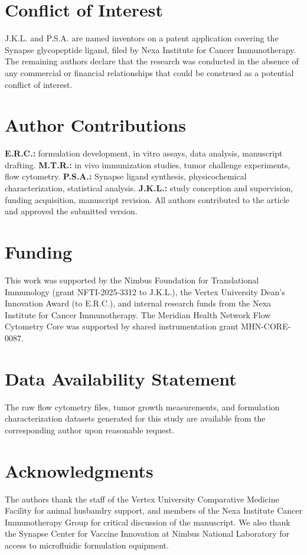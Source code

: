 \section*{Conflict of Interest}
J.K.L. and P.S.A. are named inventors on a patent application covering the Synapse glycopeptide ligand, filed by Nexa Institute for Cancer Immunotherapy. The remaining authors declare that the research was conducted in the absence of any commercial or financial relationships that could be construed as a potential conflict of interest.

\section*{Author Contributions}
\textbf{E.R.C.:} formulation development, in vitro assays, data analysis, manuscript drafting. \textbf{M.T.R.:} in vivo immunization studies, tumor challenge experiments, flow cytometry. \textbf{P.S.A.:} Synapse ligand synthesis, physicochemical characterization, statistical analysis. \textbf{J.K.L.:} study conception and supervision, funding acquisition, manuscript revision. All authors contributed to the article and approved the submitted version.

\section*{Funding}
This work was supported by the Nimbus Foundation for Translational Immunology (grant NFTI-2025-3312 to J.K.L.), the Vertex University Dean's Innovation Award (to E.R.C.), and internal research funds from the Nexa Institute for Cancer Immunotherapy. The Meridian Health Network Flow Cytometry Core was supported by shared instrumentation grant MHN-CORE-0087.

\section*{Data Availability Statement}
The raw flow cytometry files, tumor growth measurements, and formulation characterization datasets generated for this study are available from the corresponding author upon reasonable request.

\section*{Acknowledgments}
The authors thank the staff of the Vertex University Comparative Medicine Facility for animal husbandry support, and members of the Nexa Institute Cancer Immunotherapy Group for critical discussion of the manuscript. We also thank the Synapse Center for Vaccine Innovation at Nimbus National Laboratory for access to microfluidic formulation equipment.
